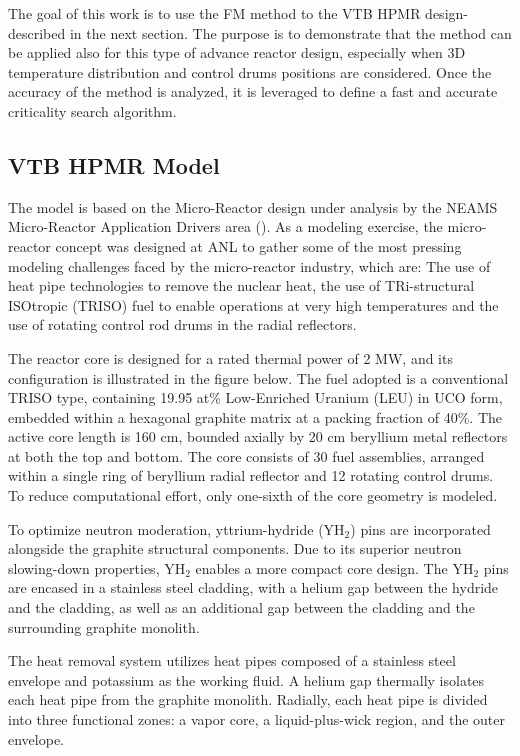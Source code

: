 \documentclass[preprint,review,12pt]{elsarticle}
\begin{document}
The goal of this work is to use the FM method to the VTB HPMR design- described in the next section. The purpose is to demonstrate that the method can be applied also for this type of advance reactor design, especially when 3D temperature distribution and control drums positions are considered. Once the accuracy of the method is analyzed, it is leveraged to define a fast and accurate criticality search algorithm. 


\subsection{VTB HPMR Model} \label{section:VTB HPMR model}
The model is based on the Micro-Reactor design under analysis by the NEAMS Micro-Reactor Application Drivers area (\cite{Stauff2024}). As a modeling exercise, the micro-reactor concept was designed at ANL to gather some of the most pressing modeling challenges faced by the micro-reactor industry, which are:  The use of heat pipe technologies to remove the nuclear heat, the use of TRi-structural ISOtropic (TRISO) fuel to enable operations at very high temperatures and the use of rotating control rod drums in the radial reflectors. 

The reactor core is designed for a rated thermal power of 2 MW, and its configuration is illustrated in the figure below. The fuel adopted is a conventional TRISO type, containing 19.95 at\% Low-Enriched Uranium (LEU) in UCO form, embedded within a hexagonal graphite matrix at a packing fraction of 40\%. The active core length is 160 cm, bounded axially by 20 cm beryllium metal reflectors at both the top and bottom. The core consists of 30 fuel assemblies, arranged within a single ring of beryllium radial reflector and 12 rotating control drums. To reduce computational effort, only one-sixth of the core geometry is modeled.

To optimize neutron moderation, yttrium-hydride (YH$_2$) pins are incorporated alongside the graphite structural components. Due to its superior neutron slowing-down properties, YH$_2$ enables a more compact core design. The YH$_2$ pins are encased in a stainless steel cladding, with a helium gap between the hydride and the cladding, as well as an additional gap between the cladding and the surrounding graphite monolith.

The heat removal system utilizes heat pipes composed of a stainless steel envelope and potassium as the working fluid. A helium gap thermally isolates each heat pipe from the graphite monolith. Radially, each heat pipe is divided into three functional zones: a vapor core, a liquid-plus-wick region, and the outer envelope.
\end{document}
